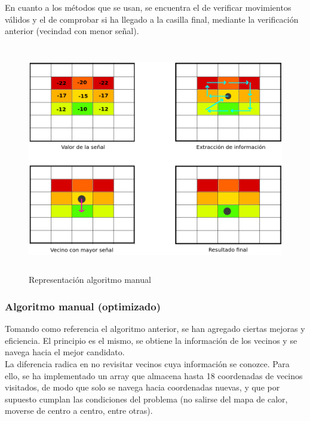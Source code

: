 En cuanto a los métodos que se usan, se encuentra el de verificar movimientos válidos y el de comprobar si ha llegado a la casilla final, mediante la verificación anterior (vecindad con menor señal).\\

\begin{figure} [H]
    \begin{center}
    \includegraphics[height=10cm]{imagenes/cap4/9_algoritmo_manual.png}
    \end{center}
    \caption[Representación algoritmo manual]{Representación algoritmo manual}
    \label{fig:manual_algorithm}
\end{figure}

\subsubsection{Algoritmo manual (optimizado)}
\label{subsec:alg-manual-opt}

Tomando como referencia el algoritmo anterior, se han agregado ciertas mejoras y eficiencia. El principio es el mismo, se obtiene la información de los vecinos y se navega hacia el mejor candidato.\\

La diferencia radica en no revisitar vecinos cuya información se conozce. Para ello, se ha implementado un array que almacena hasta 18 coordenadas de vecinos visitados, de modo que solo se navega hacia coordenadas nuevas, y que por supuesto cumplan las condiciones del problema (no salirse del mapa de calor, moverse de centro a centro, entre otras).\\

